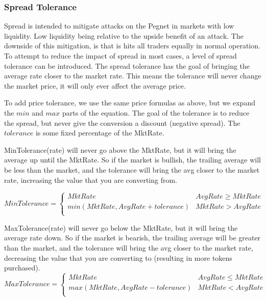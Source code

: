 \documentclass[12pt]{article}
\begin{document}
    \pagebreak
    \subsubsection{Spread Tolerance}
    
    Spread is intended to mitigate attacks on the Pegnet in markets with low liquidity. Low liquidity being relative to the upside benefit of an attack. The downside of this mitigation, is that is hits all traders equally in normal operation. To attempt to reduce the impact of spread in most cases, a level of spread tolerance can be introduced. The spread tolerance has the goal of bringing the average rate closer to the market rate. This means the tolerance will never change the market price, it will only ever affect the average price.
    
    To add price tolerance, we use the same price formulas as above, but we expand the $min$ and $max$ parts of the equation. The goal of the tolerance is to reduce the spread, but never give the conversion a discount (negative spread). The $tolerance$ is some fixed percentage of the MktRate.
    
    MinTolerance(rate) will never go above the MktRate, but it will bring the average up until the MktRate. So if the market is bullish, the trailing average will be less than the market, and the tolerance will bring the avg closer to the market rate, increasing the value that you are converting from.
    
    
    \[ MinTolerance = \begin{cases} 
      MktRate & AvgRate \geq MktRate \\
      min(MktRate, AvgRate + tolerance) & MktRate > AvgRate \\
   \end{cases}
    \]
    
    MaxTolerance(rate) will never go below the MktRate, but it will bring the average rate down. So if the market is bearish, the trailing average will be greater than the market, and the tolerance will bring the avg closer to the market rate, decreasing the value that you are converting to (resulting in more tokens purchased).
    \[ MaxTolerance = \begin{cases} 
      MktRate & AvgRate \leq MktRate \\
      max(MktRate, AvgRate - tolerance) & MktRate < AvgRate \\
   \end{cases}
    \]
    
\end{document}
